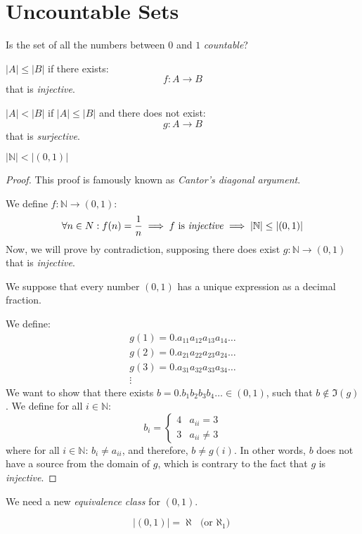 \documentclass[00_complete]{subfiles}
\begin{document}
\section{Uncountable Sets}
Is the set of all the numbers between $0$ and $1$ \emph{countable}?
\begin{definition}
    $|A|\leq|B|$ if there exists:
    $$f:A \to B$$
    that is \emph{injective}.
\end{definition}
\begin{definition}
    $|A|<|B|$ if $|A|\leq|B|$ and there does not exist:
    $$g: A \to B$$
    that is \emph{surjective}.
\end{definition}
\begin{claim}
    $|\mathbb{N}|<|(0,1)|$
\end{claim}
\begin{proof}
    This proof is famously known as \emph{Cantor's diagonal argument}.

    We define $f: \mathbb{N} \to (0,1)$:
    $$\forall n \in N: f(n)=\frac{1}{n}\implies f \text{ is
    \emph{injective}}\implies |\mathbb{N}|\leq|(0,1)|$$
    Now, we will prove by contradiction, supposing there does exist $g:
    \mathbb{N} \to (0,1)$ that is \emph{injective}.

    We suppose that every number $(0,1)$ has a unique expression as a
    decimal fraction.

    We define:
    \begin{gather*}
        g(1)=0.a_{11}a_{12}a_{13}a_{14}\dots \\
        g(2)=0.a_{21}a_{22}a_{23}a_{24}\dots \\
        g(3)=0.a_{31}a_{32}a_{33}a_{34}\dots \\
        \vdots
    \end{gather*}
    We want to show that there exists $b=0.b_1b_2b_3b_4\dots \in (0,1)$, such
    that $b \notin \Im (g)$. We define for all $i \in \mathbb{N}$:
    $$b_i=\begin{cases}
        4 & a_{ii}=3 \\
        3 & a_{ii}\neq 3
    \end{cases}$$
    where for all $i \in \mathbb{N}$: $b_i \neq a_{ii}$, and therefore, $b\neq
    g(i)$. In other words, $b$ does not have a source from the domain of $g$,
    which is contrary to the fact that $g$ is \emph{injective}.
\end{proof}
We need a new \emph{equivalence class} for $(0,1)$.
\begin{symbols}
    $$|(0,1)|=\aleph \text{ (or  $\aleph_1$)}$$
\end{symbols}
\end{document}
